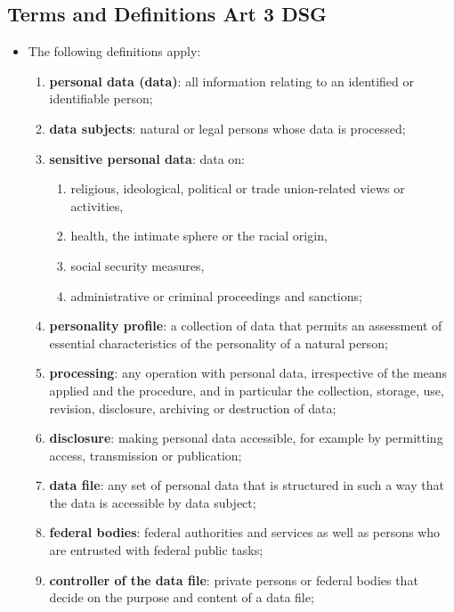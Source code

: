 \documentclass[11pt]{article}
\theoremstyle{definition}
\begin{document}
\subsection{Terms and Definitions Art 3 DSG}
\begin{itemize}[label=]
	\item The following definitions apply:
	\begin{enumerate}[label=\alph*.]
		\item \textbf{personal data (data)}: all information relating to an identified or identifiable person;
		\item \textbf{data subjects}: natural or legal persons whose data is processed;
		\item \textbf{sensitive personal data}: data on:
		\begin{enumerate}[label=\arabic*.]
			\item religious, ideological, political or trade union-related views or activities,
			\item health, the intimate sphere or the racial origin,
			\item social security measures,
			\item administrative or criminal proceedings and sanctions;
		\end{enumerate}
		\item \textbf{personality profile}: a collection of data that permits an assessment of essential characteristics of the personality of a natural person;
		\item \textbf{processing}: any operation with personal data, irrespective of the means applied and the procedure, and in particular the collection, storage, use, revision, disclosure, archiving or destruction of data;
		\item \textbf{disclosure}: making personal data accessible, for example by permitting access, transmission or publication;
		\item \textbf{data file}: any set of personal data that is structured in such a way that the data is accessible by data subject;
		\item \textbf{federal bodies}: federal authorities and services as well as persons who are entrusted with federal public tasks;
		\item \textbf{controller of the data file}: private persons or federal bodies that decide on the purpose and content of a data file;
	\end{enumerate}
\end{itemize}
\end{document}
